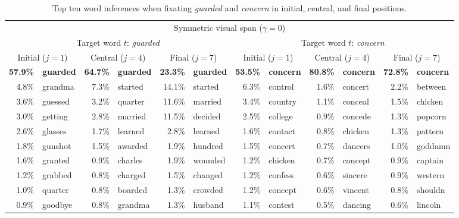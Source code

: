 \documentclass[doc,biblatex,floatsintext]{apa7}
\begin{document}
\begin{table}
\begin{adjustwidth}{-0.68in}{-0.68in}
\begin{center}
\begin{threeparttable}
\caption{Top ten word inferences when fixating \textit{guarded} and \textit{concern} in initial, central, and final positions.}
\footnotesize
\label{english_word_inferences}
\begin{tabular}{rlrlrlrlrlrl}
\toprule
\multicolumn{12}{c}{Symmetric visual span ($\gamma = 0$)} \\
\multicolumn{6}{c}{Target word $t$: \textit{guarded}} & \multicolumn{6}{c}{Target word $t$: \textit{concern}} \\
\multicolumn{2}{c}{Initial ($j=1$)} & \multicolumn{2}{c}{Central ($j=4$)} & \multicolumn{2}{c}{Final ($j=7$)} & \multicolumn{2}{c}{Initial ($j=1$)} & \multicolumn{2}{c}{Central ($j=4$)} & \multicolumn{2}{c}{Final ($j=7$)} \\
\textbf{57.9\%}     & \textbf{guarded} & \textbf{64.7\%}  & \textbf{guarded} & \textbf{23.3\%} & \textbf{guarded} & \textbf{53.5\%}  & \textbf{concern} & \textbf{80.8\%}  & \textbf{concern} & \textbf{72.8\%} & \textbf{concern} \\
4.8\%      & grandma & 7.3\%   & started & 14.1\% & started & 6.3\%   & control & 1.6\%   & concert & 2.2\%  & between \\
3.6\%      & guessed & 3.2\%   & quarter & 11.6\% & married & 3.4\%   & country & 1.1\%   & conceal & 1.5\%  & chicken \\
3.0\%      & getting & 2.8\%   & married & 11.5\% & decided & 2.5\%   & college & 0.9\%   & concede & 1.3\%  & popcorn \\
2.6\%      & glasses & 1.7\%   & learned & 2.8\%  & learned & 1.6\%   & contact & 0.8\%   & chicken & 1.3\%  & pattern \\
1.8\%      & gunshot & 1.5\%   & awarded & 1.9\%  & hundred & 1.5\%   & concert & 0.7\%   & dancers & 1.0\%  & goddamn \\
1.6\%      & granted & 0.9\%   & charles & 1.9\%  & wounded & 1.2\%   & chicken & 0.7\%   & concept & 0.9\%  & captain \\
1.2\%      & grabbed & 0.8\%   & charged & 1.5\%  & changed & 1.2\%   & confess & 0.6\%   & sincere & 0.9\%  & western \\
1.0\%      & quarter & 0.8\%   & boarded & 1.3\%  & crowded & 1.2\%   & concept & 0.6\%   & vincent & 0.8\%  & shouldn \\
0.9\%      & goodbye & 0.8\%   & grandma & 1.3\%  & husband & 1.1\%   & contest & 0.5\%   & dancing & 0.6\%  & lincoln \\

\end{tabular}
\end{threeparttable}
\end{center}
\end{adjustwidth}
\end{table}
\end{document}
